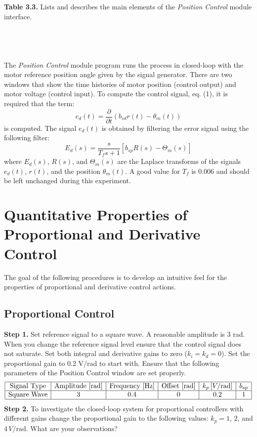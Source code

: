 \documentclass{article}
\begin{document}
\textbf{Table 3.3.} Lists and describes the main elements of the \textit{Position Control} module interface.\\\\\\\\\\

The \textit{Position Control} module program runs the process in closed-loop with the motor reference position angle given by the signal generator. There are two windows that show the time histories of motor position (control output) and motor voltage (control input).
To compute the control signal, eq. (1), it is required that the term:
\[
e_d(t) = \frac{\partial}{\partial t} \left( b_{sd}r(t) - \theta_m(t) \right)
\tag{10}
\]
is computed. The signal \( e_d(t) \) is obtained by filtering the error signal using the following filter:
\[
E_d(s) = \frac{s}{T_f s + 1} \left[ b_{sp}R(s) - \Theta_m(s) \right]
\tag{11}
\]
where \( E_d(s) \), \( R(s) \), and \( \Theta_m(s) \) are the Laplace transforms of the signals \( e_d(t) \), \( r(t) \), and the position \( \theta_m(t) \). A good value for \( T_f \) is 0.006 and should be left unchanged during this experiment.

\section{Quantitative Properties of Proportional and Derivative Control}

The goal of the following procedures is to develop an intuitive feel for the properties of proportional and derivative control actions.

\subsection{Proportional Control}

\textbf{Step 1.} Set reference signal to a square wave. A reasonable amplitude is 3 rad. When you change the reference signal level ensure that the control signal does not saturate. Set both integral and derivative gains to zero (\(k_i = k_d = 0\)). Set the proportional gain to 0.2 V/rad to start with. Ensure that the following parameters of the Position Control window are set properly.
\[
\begin{array}{|c|c|c|c|c|c|}
\hline
\text{Signal Type} & \text{Amplitude [rad]} & \text{Frequency [Hz]} & \text{Offset [rad]} & k_p \, [V/\text{rad}] & b_{sp} \\
\hline
\text{Square Wave} & 3 & 0.4 & 0 & 0.2 & 1 \\
\hline
\end{array}
\]
\textbf{Step 2.} To investigate the closed-loop system for proportional controllers with different gains change the proportional gain to the following values: \( k_p = 1 \), \( 2 \), and \( 4 \, V/\text{rad} \). What are your observations?
\end{document}
